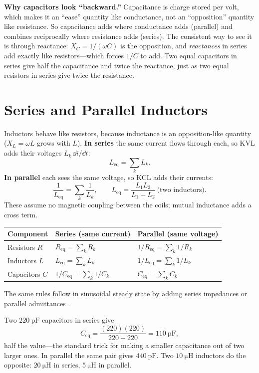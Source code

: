\begin{physicalbox}
\textbf{Why capacitors look ``backward.''} Capacitance is charge stored per volt,
which makes it an ``ease'' quantity like conductance, not an ``opposition'' quantity
like resistance. So capacitance adds where conductance adds (parallel) and combines
reciprocally where resistance adds (series). The consistent way to see it is through
reactance: \(X_C=1/(\omega C)\) is the opposition, and \emph{reactances} in series
add exactly like resistors---which forces \(1/C\) to add. Two equal capacitors in
series give half the capacitance and twice the reactance, just as two equal
resistors in series give twice the resistance.
\end{physicalbox}

\section{Series and Parallel Inductors}
Inductors behave like resistors, because inductance is an opposition-like quantity
(\(X_L=\omega L\) grows with \(L\)). \textbf{In series} the same current flows
through each, so KVL adds their voltages \(L_k\,\dd i/\dd t\):
\[
L_{\mathrm{eq}}=\sum_k L_k .
\]
\textbf{In parallel} each sees the same voltage, so KCL adds their currents:
\[
\frac{1}{L_{\mathrm{eq}}}=\sum_k\frac{1}{L_k},
\qquad
L_{\mathrm{eq}}=\frac{L_1L_2}{L_1+L_2}\ \text{(two inductors)}.
\]
These assume no magnetic coupling between the coils; mutual inductance adds a cross
term.

\begin{center}
\begin{tabularx}{\textwidth}{@{}L{0.17\textwidth}Y Y@{}}
\toprule
Component & Series (same current) & Parallel (same voltage) \\
\midrule
Resistors \(R\) & \(R_{\mathrm{eq}}=\sum_k R_k\) & \(1/R_{\mathrm{eq}}=\sum_k 1/R_k\) \\
Inductors \(L\) & \(L_{\mathrm{eq}}=\sum_k L_k\) & \(1/L_{\mathrm{eq}}=\sum_k 1/L_k\) \\
Capacitors \(C\) & \(1/C_{\mathrm{eq}}=\sum_k 1/C_k\) & \(C_{\mathrm{eq}}=\sum_k C_k\) \\
\bottomrule
\end{tabularx}
\end{center}
The same rules follow in sinusoidal steady state by adding series impedances or
parallel admittances \cite[pp.~28--32]{white2004highfrequency}.

\begin{workedbox}
Two \(\SI{220}{\pico\farad}\) capacitors in series give
\[
C_{\mathrm{eq}}=\frac{(220)(220)}{220+220}=\SI{110}{\pico\farad},
\]
half the value---the standard trick for making a smaller capacitance out of two
larger ones. In parallel the same pair gives \(\SI{440}{\pico\farad}\). Two
\(\SI{10}{\micro\henry}\) inductors do the opposite: \(\SI{20}{\micro\henry}\) in
series, \(\SI{5}{\micro\henry}\) in parallel.
\end{workedbox}

